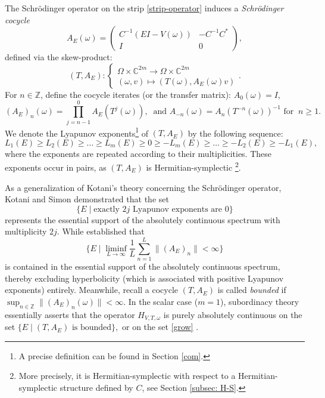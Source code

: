 \documentclass[11pt]{amsart}
\theoremstyle{remark}
\theoremstyle{definition}
\begin{document}
The Schr\"odinger operator on the strip \eqref{strip-operator} induces a \emph{Schr\"odinger cocycle} 
\begin{equation}\label{eqn: Sc ccy}
A_E(\omega) = \begin{pmatrix}
    C^{-1}(EI - V(\omega)) & -C^{-1}C^* \\
    I & 0
\end{pmatrix},
\end{equation}
defined via the skew-product:
\[
(T,A_E): \begin{cases}
    \Omega \times \mathbb{C}^{2m} \to \Omega \times \mathbb{C}^{2m} \\
    (\omega,v) \mapsto (T(\omega), A_E(\omega)v)
\end{cases}.
\] For $n \in \mathbb{Z}$, define the cocycle iterates (or the transfer matrix):
$A_{0}(\omega)=I$,
\begin{equation*}
	(A_E)_{n}(\omega)=\prod_{j=n-1}^{0}A_E(T^{j}(\omega)),\  \text{ and } A_{-n}(\omega)=A_{n}(T^{-n}(\omega))^{-1} \text{ for }\ n\ge1.
\end{equation*}
We denote the Lyapunov exponents\footnote{A precise definition can be found in Section \ref{com}.} of $(T, A_E)$ by the following sequence: $$L_1(E) \geq L_2(E) \geq \ldots \geq L_m(E) \geq 0 \geq -L_m(E) \geq \ldots  \geq -L_2(E) \geq -L_1(E),$$ where the exponents are repeated according to their multiplicities. These exponents occur in pairs, as $(T, A_E)$ is Hermitian-symplectic \cite{Puig}\footnote{More precisely, it is Hermitian-symplectic with respect to a Hermitian-symplectic structure defined by $C$, see Section \ref{subsec: H-S}.}. 


As a generalization of Kotani's theory \cite{Ko} concerning the Schr\"odinger operator, Kotani and Simon \cite{KS} demonstrated that the set
\begin{equation}\label{kotani}
\{ E \mid \text{exactly } 2j \text{ Lyapunov exponents are } 0 \}
\end{equation}
represents the essential support of the absolutely continuous spectrum with multiplicity $2j$. While \cite{MS,OC} established that 
\begin{equation}\label{grow}
  \{ E \mid \liminf_{L\rightarrow \infty} \frac{1}{L} \sum_{n=1}^L\|(A_E)_{n}\|<\infty\}  
\end{equation}
is contained in the essential support of the absolutely continuous spectrum, thereby excluding hyperbolicity (which is associated with positive Lyapunov exponents) entirely. 
Meanwhile, recall a cocycle $(T,A_E)$ is called \emph{bounded} if
$
\sup_{n \in \mathbb{Z}} \|(A_E)_n(\omega)\| < \infty.
$
In the scalar case ($m=1$), subordinacy theory \cite{Simon} essentially asserts that the operator $H_{V,T,\omega}$ is purely absolutely continuous on the set
$
\{E \mid (T,A_E) \text{ is bounded}\},
$
or on the set \eqref{grow} \cite{LS}. 
\end{document}
